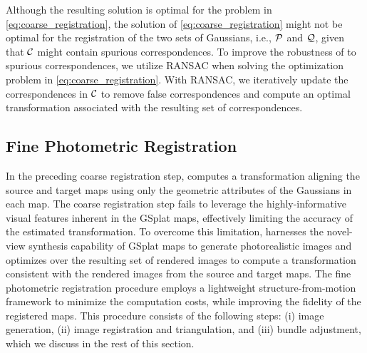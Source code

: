 Although the resulting solution is optimal for the problem in \eqref{eq:coarse_registration}, the solution of \eqref{eq:coarse_registration} might not be optimal for the registration of the two sets of Gaussians, i.e., $\mathcal{P}$ and $\mathcal{Q}$, given that $\mathcal{C}$ might contain spurious correspondences. To improve the robustness of \algname to spurious correspondences, we utilize RANSAC \cite{fischler1981random} when solving the optimization problem in \eqref{eq:coarse_registration}. With RANSAC, we iteratively update the correspondences in $\mathcal{C}$ to remove false correspondences and compute an optimal transformation associated with the resulting set of correspondences.

\subsection{Fine Photometric Registration}
In the preceding coarse registration step, \algname computes a transformation aligning the source and target maps using only the geometric attributes of the Gaussians in each map. The coarse registration step fails to leverage the highly-informative visual features inherent in the GSplat maps, effectively limiting the accuracy of the estimated transformation. To overcome this limitation, \algname harnesses the novel-view synthesis capability of GSplat maps to generate photorealistic images and optimizes over the resulting set of rendered images to compute a transformation consistent with the rendered images from the source and target maps. The fine photometric registration procedure employs a lightweight structure-from-motion framework to minimize the computation costs, while improving the fidelity of the registered maps. This procedure consists of the following steps: (i) image generation, (ii) image registration and triangulation, and (iii) bundle adjustment, which we discuss in the rest of this section.

